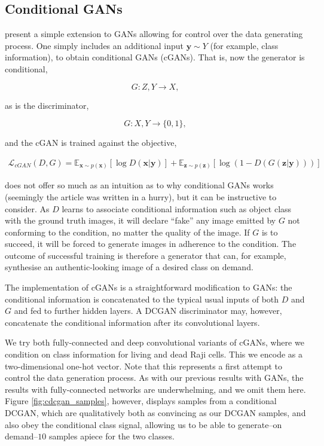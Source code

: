 \subsection{Conditional GANs}

\cite{mirza2014conditional} present a simple extension to GANs allowing for control over the data generating process. One simply includes an additional input $\mathbf{y} \sim Y$ (for example, class information), to obtain conditional GANs (cGANs). That is, now the generator is conditional,

\begin{equation}
G : Z, Y \to X,
\end{equation}

as is the discriminator,

\begin{equation}
G : X, Y \to \{0, 1\},
\end{equation}

and the cGAN is trained against the objective,

\begin{align}\mathcal{L}_{cGAN}(D, G) = \mathbb{E}_{\mathbf{x} \sim p(\mathbf{x})}[\log D(\mathbf{x} | \mathbf{y})] + \mathbb{E}_{\mathbf{z} \sim p(\mathbf{z})}[\log(1 - D(G(\mathbf{z} | \mathbf{y})))]
\end{align}

\cite{mirza2014conditional} does not offer so much as an intuition as to why conditional GANs works (seemingly the article was written in a hurry), but it can be instructive to consider. As $D$ learns to associate conditional information such as object class with the ground truth images, it will declare ``fake'' any image emitted by $G$ not conforming to the condition, no matter the quality of the image. If $G$ is to succeed, it will be forced to generate images in adherence to the condition. The outcome of successful training is therefore a generator that can, for example, synthesise an authentic-looking image of a desired class on demand.

The implementation of cGANs is a straightforward modification to GANs: the conditional information is concatenated to the typical usual inputs of both $D$ and $G$ and fed to further hidden layers. A DCGAN discriminator may, however, concatenate the conditional information after its convolutional layers.

We try both fully-connected and deep convolutional variants of cGANs, where we condition on class information for living and dead Raji cells. This we encode as a two-dimensional one-hot vector. Note that this represents a first attempt to control the data generation process. As with our previous results with GANs, the results with fully-connected networks are underwhelming, and we omit them here. Figure \ref{fig:cdcgan_samples}, however, displays samples from a conditional DCGAN, which are qualitatively both as convincing as our DCGAN samples, and also obey the conditional class signal, allowing us to be able to generate--on demand--$10$ samples apiece for the two classes.

